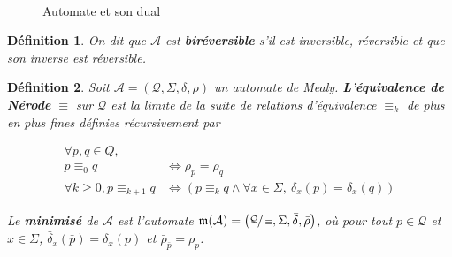 \documentclass[11pt,a4paper]{article}
\newtheorem{definition}{Définition}
\begin{document}
\begin{figure}[h!]
  \begin{subfigure}[b]{0.5\textwidth}
    \centering
  \end{subfigure}
  ~
  \begin{subfigure}[b]{0.5\textwidth}
    \centering
  \end{subfigure}
  \caption{Automate et son dual}
\end{figure}


\begin{definition} \label{def:birev}
  On dit que $\mathcal{A}$ est \textbf{biréversible} s'il est inversible, réversible et que son inverse est réversible.
\end{definition}

\begin{definition}
  Soit $\mathcal{A}=\left(\mathcal{Q}, \Sigma, \delta, \rho\right)$ un automate de Mealy. \textbf{L'équivalence de Nérode} $\equiv$ sur $\mathcal{Q}$ est la limite de la suite de relations d'équivalence $\equiv_k$ de plus en plus fines définies récursivement par

  \begin{align*}
    \forall p, q \in Q,\\
    p \equiv_0 q &\iff \rho_p = \rho_q \\
    \forall k \geq 0, p \equiv_{k+1}q &\iff \left(p\equiv_kq \wedge \forall x \in \Sigma,~\delta_x(p)=\delta_x(q)\right)
  \end{align*}

  Le \textbf{minimisé} de $\mathcal{A}$ est l'automate $\mathfrak{m}(\mathcal{A})=\left(\sfrac{\mathcal{Q}}{\equiv}, \Sigma, \bar{\delta}, \bar{\rho}\right)$, où pour tout $p\in\mathcal{Q}$ et $x\in\Sigma$, $\bar{\delta}_x(\bar{p}) = \bar{\delta_x(p)}$ et $\bar{\rho}_{\bar{p}} =  \rho_p$.
\end{definition}
\end{document}
